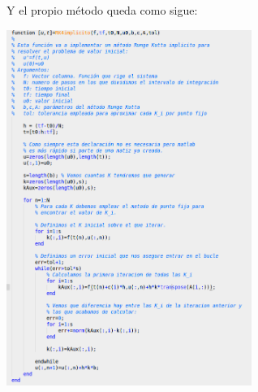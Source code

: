 Y el propio método queda como sigue:
\begin{center}
\includegraphics[width=0.6\textwidth]{img/RK4_implicito.png}
\end{center}

